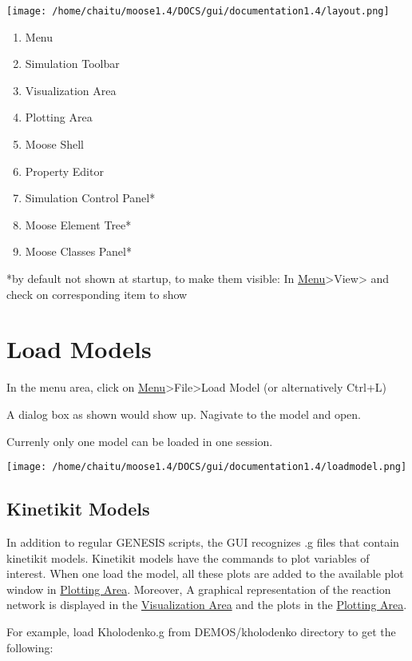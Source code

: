 \documentclass[11pt]{article}
\begin{document}
  \texttt{[image: /home/chaitu/moose1.4/DOCS/gui/documentation1.4/layout.png]}
  
\begin{enumerate}
\item Menu
\item Simulation Toolbar
\item Visualization Area
\item Plotting Area
\item Moose Shell
\item Property Editor
\item Simulation Control Panel*
\item Moose Element Tree*
\item Moose Classes Panel*
\end{enumerate}
  
  *by default not shown at startup, to make them visible: In \hyperref[sec-2]{Menu}>View> and check on corresponding item to show  

\section{Load Models}
\label{sec-3}


  In the menu area, click on \hyperref[sec-2]{Menu}>File>Load Model (or alternatively Ctrl+L)

  A dialog box as shown would show up. Nagivate to the model and open.

  Currenly only one model can be loaded in one session.
  
  \texttt{[image: /home/chaitu/moose1.4/DOCS/gui/documentation1.4/loadmodel.png]}

\subsection{Kinetikit Models}
\label{sec-3.1}


   In addition to regular GENESIS scripts, the GUI recognizes .g files that contain kinetikit models. Kinetikit models have the commands to plot variables of interest. When one load the model, all these plots are added to the available plot window in \hyperref[sec-2]{Plotting Area}. Moreover,  A graphical representation of the reaction network is displayed in the \hyperref[sec-2]{Visualization Area} and the plots in the \hyperref[sec-2]{Plotting Area}. 
   
   For example, load Kholodenko.g from DEMOS/kholodenko directory to get the following:
\end{document}
